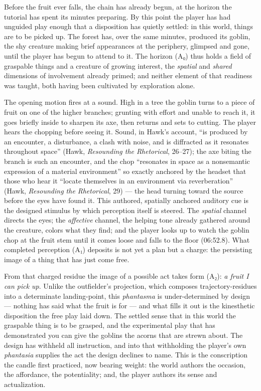 \documentclass{article}
\begin{document}
Before the fruit ever falls, the chain has already begun, at the horizon the tutorial has spent its minutes preparing. By this point the player has had unguided play enough that a disposition has quietly settled: in this world, things are to be picked up. The forest has, over the same minutes, produced its goblin, the shy creature making brief appearances at the periphery, glimpsed and gone, until the player has begun to attend to it. The horizon (A₀) thus holds a field of graspable things and a creature of growing interest, the \textit{spatial} and \textit{shared} dimensions of involvement already primed; and neither element of that readiness was taught, both having been cultivated by exploration alone.

The opening motion fires at a sound. High in a tree the goblin turns to a piece of fruit on one of the higher branches; grunting with effort and unable to reach it, it goes briefly inside to sharpen its axe, then returns and sets to cutting. The player hears the chopping before seeing it. Sound, in Hawk's account, ``is produced by an encounter, a disturbance, a clash with noise, and is diffracted as it resonates throughout space'' (Hawk, \textit{Resounding the Rhetorical}, 26--27); the axe biting the branch is such an encounter, and the chop ``resonates in space as a nonsemantic expression of a material environment'' so exactly anchored by the headset that those who hear it ``locate themselves in an environment via reverberation'' (Hawk, \textit{Resounding the Rhetorical}, 29) — the head turning toward the source before the eyes have found it. This authored, spatially anchored auditory cue is the designed stimulus by which perception itself is steered. The \textit{spatial} channel directs the eyes; the \textit{affective} channel, the helping tone already gathered around the creature, colors what they find; and the player looks up to watch the goblin chop at the fruit stem until it comes loose and falls to the floor (06:52.8). What completed perception (A₁) deposits is not yet a plan but a charge: the persisting image of a thing that has just come free.

From that charged residue the image of a possible act takes form (A₂): \textit{a fruit I can pick up}. Unlike the outfielder's projection, which composes trajectory-residues into a determinate landing-point, this \textit{phantasma} is under-determined by design — nothing has said what the fruit is for — and what fills it out is the kinesthetic disposition the free play laid down. The settled sense that in this world the graspable thing is to be grasped, and the experimental play that has demonstrated you can give the goblins the acorns that are strewn about. The design has withheld all instruction, and into that withholding the player's own \textit{phantasia} supplies the act the design declines to name. This is the conscription the candle first practiced, now bearing weight: the world authors the occasion, the affordance, the potentiality; and, the player authors its sense and actualization.
\end{document}
